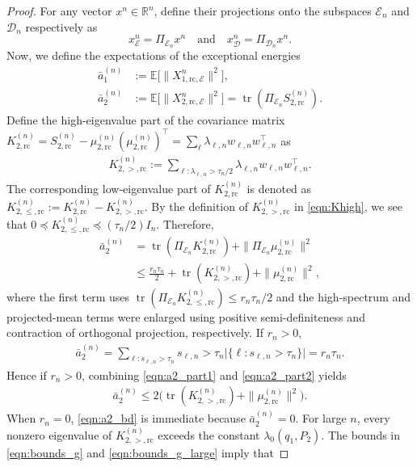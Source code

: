 \documentclass[11pt,onecolumn]{IEEEtran}
\newcommand{\calD}{\mathcal{D}}
\newcommand{\calE}{\mathcal{E}}
\newcommand{\bbE}{\mathbb{E}}
\newcommand{\bbR}{\mathbb{R}}
\newcommand{\bara}{\bar{a}}
\DeclareMathOperator{\tr}{tr}
\newcommand{\rc}{\mathrm{rc}}
\begin{document}
\begin{proof}
For any vector $x^n\in\bbR^n$, define their projections onto the subspaces $\calE_n$ and $\calD_n$ respectively as 
\begin{equation}
x_{\calE}^n = \Pi_{\calE_n}x^n\quad \mbox{and}\quad  x_{\calD}^n = \Pi_{\calD_n}x^n. \label{eqn:convention} 
\end{equation}
Now, we define the expectations of the exceptional energies
\begin{align}
    \bara_1^{(n)} &:=\bbE \big[ \|X_{1,\rc,\calE}^n\|^2 \big], \\
    \bara_2^{(n)} &:=\bbE \big[ \|X_{2,\rc,\calE}^n\|^2 \big]=\tr(\Pi_{\calE_n}S_{2,\rc}^{(n)}).
\end{align}
Define the high-eigenvalue part of the covariance matrix $K_{2,\rc}^{(n)} = S_{2,\rc}^{(n)}-\mu_{2,\rc}^{(n)}(\mu_{2,\rc}^{(n)})^\top = \sum_\ell \lambda_{\ell,n}w_{\ell,n}w_{\ell,n}^\top$ as 
\begin{align}
K_{2,>,\rc}^{(n)}:=\sum_{\ell:\lambda_{\ell,n}>\tau_n /2}\lambda_{\ell,n}w_{\ell,n}w_{\ell,n}^\top .\label{eqn:Khigh}
\end{align}
The corresponding low-eigenvalue part of $K_{2,\rc}^{(n)} $ is denoted as $K_{2,\le,\rc}^{(n)} := K_{2,\rc}^{(n)}-K_{2,>,\rc}^{(n)}$. By the definition  of $K_{2,>,\rc}^{(n)}$ in \eqref{eqn:Khigh}, we see that $0\preceq K_{2,\le,\rc}^{(n)} \preceq (\tau_n/2) I_n$. Therefore,
\begin{align}
    \bara_2^{(n)} & = \tr(\Pi_{\calE_n}K_{2,\rc}^{(n)}  ) + \|\Pi_{\calE_n}\mu_{2,\rc}^{(n)} \|^2 \\ 
    &\le\frac{r_n\tau_n}{2 } + \tr( K_{2,>,\rc}^{(n)}) + \|\mu_{2,\rc}^{(n)} \|^2 , \label{eqn:a2_part1}
\end{align}
where the first term uses $\tr(\Pi_{\calE_n}K_{2,\le,\rc}^{(n)})\le r_n\tau_n/2$   and the high-spectrum and projected-mean terms
were enlarged using positive semi-definiteness and contraction of orthogonal projection, respectively. If $r_n>0$, 
\begin{align}
    \bara_2^{(n)} =\sum_{\ell : s_{\ell,n}>\tau_n} s_{\ell,n}> \tau_n \big| \{\ell: s_{\ell,n}>\tau_n\} \big| = r_n\tau_n.\label{eqn:a2_part2}
\end{align}
Hence if $r_n>0$, combining \eqref{eqn:a2_part1} and \eqref{eqn:a2_part2} yields
\begin{align}
\bara_2^{(n)}\le 2\big(   \tr( K_{2,>,\rc}^{(n)}) + \|\mu_{2,\rc}^{(n)} \|^2 \big). \label{eqn:a2_bd}
\end{align}
When $r_n=0$, \eqref{eqn:a2_bd} is immediate because $\bara_2^{(n)}=0$. For large $n$, every nonzero eigenvalue of $K_{2,>,\rc}^{(n)}$ exceeds the constant $\lambda_0(q_1, P_2)$. The bounds in \eqref{eqn:bounds_g} and \eqref{eqn:bounds_g_large} imply that 

\end{proof}
\end{document}
